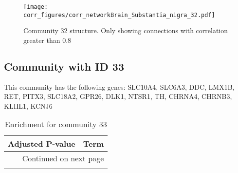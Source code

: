 \begin{figure}[h!]
\centering
\texttt{[image: corr\_figures/corr\_networkBrain\_Substantia\_nigra\_32.pdf]}
\caption{Community 32 structure. Only showing connections with correlation greater than 0.8}
\end{figure}




\subsection*{Community with ID 33}
This community has the following genes: SLC10A4, SLC6A3, DDC, LMX1B, RET, PITX3, SLC18A2, GPR26, DLK1, NTSR1, TH, CHRNA4, CHRNB3, KLHL1, KCNJ6
\\
\begin{longtable}{p{2.4cm}p{14.5cm}}
\caption{Enrichment for community 33}\\
\toprule
Adjusted \newline P-value &                                                                                                               Term \\
\midrule
\endhead
\midrule
\multicolumn{2}{r}{{Continued on next page}} \\
\midrule
\endfoot


\end{longtable}
